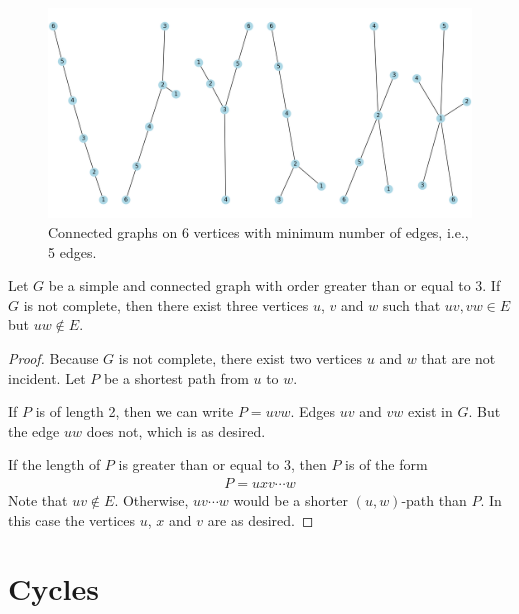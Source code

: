 \documentclass[thmcnt=section, 12pt, color=cyan]{my-elegantbook}
\begin{document}
\begin{figure}[ht]
	\centering
	\includegraphics[scale=0.5]{figures/g-006.png}
	\caption{
		Connected graphs on 6 vertices 
		with minimum number of edges, 
		i.e., 5 edges.
	}	
	\label{fig:6}
\end{figure}



\begin{proposition} \label{pro:7}
	Let $G$ be a simple and connected graph
	with order greater than or equal to 3.
	If $G$ is not complete,
	then there exist three vertices $u$, $v$ and $w$ such that 
	$uv, vw \in E$ but $uw \notin E$.
\end{proposition}

\begin{proof}
	Because $G$ is not complete, 
	there exist two vertices $u$ and $w$ that are not incident.
	Let $P$ be a shortest path from $u$ to $w$.
	
	If $P$ is of length 2, then we can write 
	$P = u v w$.
	Edges $uv$ and $vw$ exist in $G$. 
	But the edge $uw$ does not, which is as desired.

	If the length of $P$ is greater than or equal to $3$, 
	then $P$ is of the form 
	\begin{align*}
		P = u x v \cdots w 
	\end{align*}
	Note that $uv \notin E$. 
	Otherwise, $u v \cdots w$ would be 
	a shorter $(u,w)$-path than $P$.
	In this case the vertices $u$, $x$ and $v$ are as desired.
\end{proof}


\section{Cycles}

\end{document}
